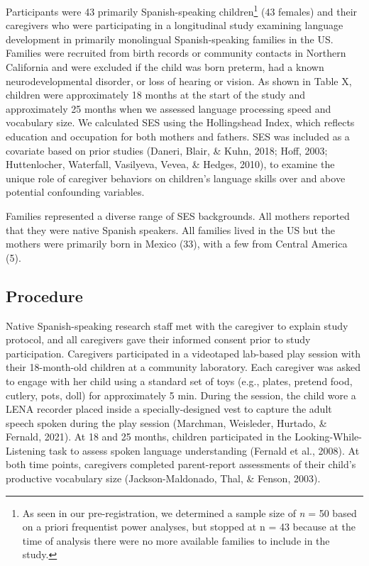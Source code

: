 \documentclass[
  english,
  man,floatsintext]{apa6}
\begin{document}
Participants were 43 primarily Spanish-speaking children\footnote{As seen in our pre-registration, we determined a sample size of \emph{n} = 50 based on a priori frequentist power analyses, but stopped at n = 43 because at the time of analysis there were no more available families to include in the study.} (43 females) and their caregivers who were participating in a longitudinal study examining language development in primarily monolingual Spanish-speaking families in the US. Families were recruited from birth records or community contacts in Northern California and were excluded if the child was born preterm, had a known neurodevelopmental disorder, or loss of hearing or vision. As shown in Table X, children were approximately 18 months at the start of the study and approximately 25 months when we assessed language processing speed and vocabulary size. We calculated SES using the Hollingshead Index, which reflects education and occupation for both mothers and fathers. SES was included as a covariate based on prior studies (Daneri, Blair, \& Kuhn, 2018; Hoff, 2003; Huttenlocher, Waterfall, Vasilyeva, Vevea, \& Hedges, 2010), to examine the unique role of caregiver behaviors on children's language skills over and above potential confounding variables.

Families represented a diverse range of SES backgrounds. All mothers reported that they were native Spanish speakers. All families lived in the US but the mothers were primarily born in Mexico (33), with a few from Central America (5).

\hypertarget{procedure}{%
\subsection{Procedure}\label{procedure}}

Native Spanish-speaking research staff met with the caregiver to explain study protocol, and all caregivers gave their informed consent prior to study participation. Caregivers participated in a videotaped lab-based play session with their 18-month-old children at a community laboratory. Each caregiver was asked to engage with her child using a standard set of toys (e.g., plates, pretend food, cutlery, pots, doll) for approximately 5 min. During the session, the child wore a LENA recorder placed inside a specially-designed vest to capture the adult speech spoken during the play session (Marchman, Weisleder, Hurtado, \& Fernald, 2021). At 18 and 25 months, children participated in the Looking-While-Listening task to assess spoken language understanding (Fernald et al., 2008). At both time points, caregivers completed parent-report assessments of their child's productive vocabulary size (Jackson-Maldonado, Thal, \& Fenson, 2003).
\end{document}

